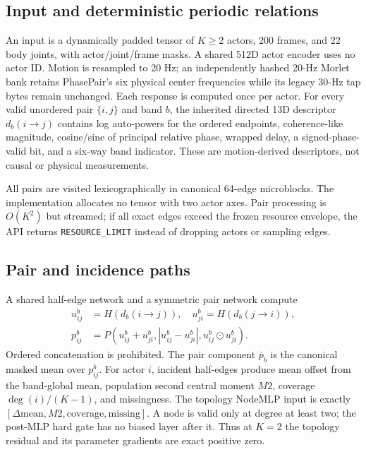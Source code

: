 \documentclass{article}
\begin{document}
\subsection{Input and deterministic periodic relations}
An input is a dynamically padded tensor of $K\!\geq\!2$ actors, 200 frames,
and 22 body joints, with actor/joint/frame masks. A shared 512D actor encoder
uses no actor ID. Motion is resampled to 20 Hz; an independently hashed 20-Hz
Morlet bank retains PhasePair's six physical center frequencies while its
legacy 30-Hz tap bytes remain unchanged. Each response is computed once per actor. For every
valid unordered pair $\{i,j\}$ and band $b$, the inherited directed 13D
descriptor $d_b(i{\to}j)$ contains log auto-powers for the ordered endpoints,
coherence-like magnitude, cosine/sine of principal relative phase, wrapped
delay, a signed-phase-valid bit, and a six-way band indicator. These are
motion-derived descriptors, not causal or physical measurements.

All pairs are visited lexicographically in canonical 64-edge microblocks. The
implementation allocates no tensor with two actor axes. Pair processing is
$O(K^2)$ but streamed; if all exact edges exceed the frozen resource envelope,
the API returns \texttt{RESOURCE\_LIMIT} instead of dropping actors or sampling
edges.

\subsection{Pair and incidence paths}
A shared half-edge network and a symmetric pair network compute
\begin{equation}
\begin{split}
u_{ij}^{b}&=H(d_b(i{\to}j)),\quad u_{ji}^{b}=H(d_b(j{\to}i)),\\
p_{ij}^{b}&=P\!\left(u_{ij}^{b}+u_{ji}^{b},
 |u_{ij}^{b}-u_{ji}^{b}|,u_{ij}^{b}\odot u_{ji}^{b}\right).
\end{split}
\label{eq:pair}
\end{equation}
Ordered concatenation is prohibited. The pair component $\bar p_b$ is the
canonical masked mean over $p_{ij}^{b}$. For actor $i$, incident half-edges
produce mean offset from the band-global mean, population second central
moment $M2$, coverage $\deg(i)/(K-1)$, and missingness. The topology NodeMLP
input is exactly $[\Delta\mathrm{mean},M2,\mathrm{coverage},\mathrm{missing}]$.
A node is valid only at degree at least two; the post-MLP hard gate has no
biased layer after it. Thus at $K{=}2$ the topology residual and its parameter
gradients are exact positive zero.
\end{document}
